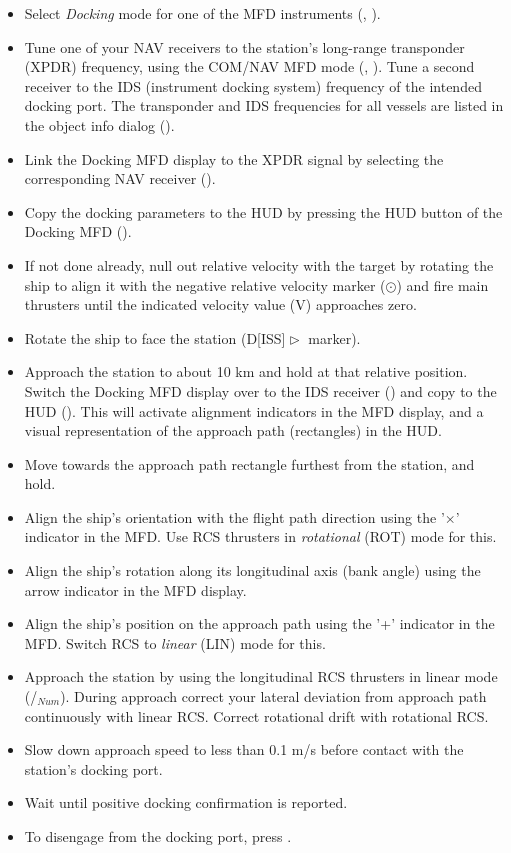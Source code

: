 \documentclass[Orbiter User Manual.tex]{subfiles}
\begin{document}
\begin{itemize}
\item Select \textit{Docking} mode for one of the MFD instruments (\Shift{}, \Shift{}).
\item Tune one of your NAV receivers to the station's long-range transponder (XPDR) frequency, using the COM/NAV MFD mode (\Shift{}, \Shift{}). Tune a second receiver to the IDS (instrument docking system) frequency of the intended docking port. The transponder and IDS frequencies for all vessels are listed in the object info dialog (\Ctrl{}).
\item Link the Docking MFD display to the XPDR signal by selecting the corresponding NAV receiver (\Shift{}).
\item Copy the docking parameters to the HUD by pressing the HUD button of the Docking MFD (\Shift{}).
\item If not done already, null out relative velocity with the target by rotating the ship to align it with the negative relative velocity marker ($\odot$) and fire main thrusters until the indicated velocity value (V) approaches zero.
\item Rotate the ship to face the station (D[ISS]$\vartriangleright$ marker).
\item Approach the station to about 10 km and hold at that relative position. Switch the Docking MFD display over to the IDS receiver (\Shift{}) and copy to the HUD (\Shift{}). This will activate alignment indicators in the MFD display, and a visual representation of the approach path (rectangles) in the HUD.
\item Move towards the approach path rectangle furthest from the station, and hold.
\item Align the ship's orientation with the flight path direction using the '$\times$' indicator in the MFD. Use RCS thrusters in \textit{rotational} (ROT) mode for this.
\item Align the ship's rotation along its longitudinal axis (bank angle) using the arrow indicator in the MFD display.
\item Align the ship's position on the approach path using the '+' indicator in the MFD. Switch RCS to \textit{linear} (LIN) mode for this.
\item Approach the station by using the longitudinal RCS thrusters in linear mode (/$_{Num}$). During approach correct your lateral deviation from approach path continuously with linear RCS. Correct rotational drift with rotational RCS.
\item Slow down approach speed to less than 0.1 m/s before contact with the station's docking port.
\item Wait until positive docking confirmation is reported.
\item To disengage from the docking port, press \Ctrl{}.
\end{itemize}
\end{document}

